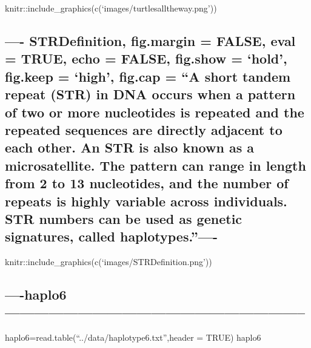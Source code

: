 \documentclass[]{article}
\begin{document}
knitr::include\_graphics(c(`images/turtlesalltheway.png'))

\subsection{\texorpdfstring{---- STRDefinition, fig.margin = FALSE, eval
= TRUE, echo = FALSE, fig.show = `hold', fig.keep = `high', fig.cap =
``A short tandem repeat (STR) in DNA occurs when a pattern of two or
more nucleotides is repeated and the repeated sequences are directly
adjacent to each other. An STR is also known as a microsatellite. The
pattern can range in length from 2 to 13 nucleotides, and the number of
repeats is highly variable across individuals. STR numbers can be used
as genetic signatures, called
haplotypes.''----}{---- STRDefinition, fig.margin = FALSE, eval = TRUE, echo = FALSE, fig.show = hold, fig.keep = high, fig.cap = A short tandem repeat (STR) in DNA occurs when a pattern of two or more nucleotides is repeated and the repeated sequences are directly adjacent to each other. An STR is also known as a microsatellite. The pattern can range in length from 2 to 13 nucleotides, and the number of repeats is highly variable across individuals. STR numbers can be used as genetic signatures, called haplotypes.----}}\label{strdefinition-fig.margin-false-eval-true-echo-false-fig.show-hold-fig.keep-high-fig.cap-a-short-tandem-repeat-str-in-dna-occurs-when-a-pattern-of-two-or-more-nucleotides-is-repeated-and-the-repeated-sequences-are-directly-adjacent-to-each-other.-an-str-is-also-known-as-a-microsatellite.-the-pattern-can-range-in-length-from-2-to-13-nucleotides-and-the-number-of-repeats-is-highly-variable-across-individuals.-str-numbers-can-be-used-as-genetic-signatures-called-haplotypes.-}

knitr::include\_graphics(c(`images/STRDefinition.png'))

\subsection{----haplo6--------------------------------------------------------------}\label{haplo6}

haplo6=read.table(``../data/haplotype6.txt'',header = TRUE) haplo6
\end{document}
